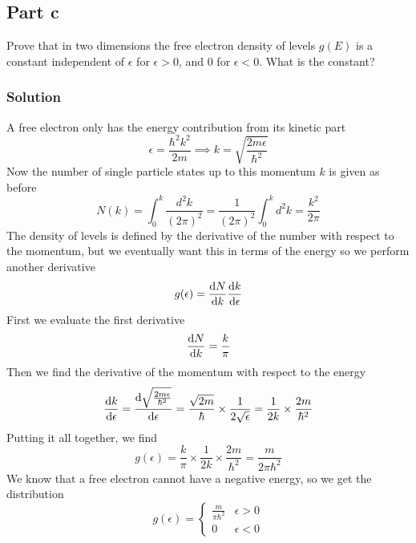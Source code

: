 \documentclass[12pt]{article}
\begin{document}
\subsection{Part c}
Prove that in two dimensions the free electron density of levels \( g(E) \) is a constant independent of \( \epsilon \) for \( \epsilon > 0 \), and 0 for \( \epsilon < 0 \). What is the constant?
\subsubsection{Solution}
A free electron only has the energy contribution from its kinetic part
\begin{equation}
    \epsilon = \frac{\hbar^2 k^2}{2m} \implies k = \sqrt{\frac{2m\epsilon}{\hbar^2}}
\end{equation}
Now the number of single particle states up to this momentum \( k \) is given as before
\begin{equation}
    N(k) = \int_{0}^{k} \frac{d^2k}{(2\pi)^2} = \frac{1}{(2\pi)^2} \int_{0}^{k} d^2k = \frac{k^2}{2\pi}
\end{equation}
The density of levels is defined by the derivative of the number with respect to the momentum, but we eventually want this in terms of the energy so we perform another derivative
\begin{equation}
    g(\epsilon) = \dv{N}{k} \dv{k}{\epsilon}
\end{equation}
First we evaluate the first derivative
\begin{equation}
    \dv{N}{k} = \frac{k}{\pi}
\end{equation}
Then we find the derivative of the momentum with respect to the energy
\begin{equation}
    \dv{k}{\epsilon} = \dv{\sqrt{\frac{2m\epsilon}{\hbar^2}}}{\epsilon} = \frac{\sqrt{2m}}{\hbar} \times \frac{1}{2\sqrt{\epsilon}} = \frac{1}{2k} \times \frac{2m}{\hbar^2}
\end{equation}
Putting it all together, we find
\begin{equation}
    g(\epsilon) = \frac{k}{\pi} \times \frac{1}{2k} \times \frac{2m}{\hbar^2} = \frac{m}{2\pi \hbar^2}
\end{equation}
We know that a free electron cannot have a negative energy, so we get the distribution
\begin{equation}
    g(\epsilon) = \begin{cases}
        \frac{m}{\pi \hbar^2} & \epsilon > 0 \\
        0 & \epsilon < 0
    \end{cases}
\end{equation}
\end{document}
